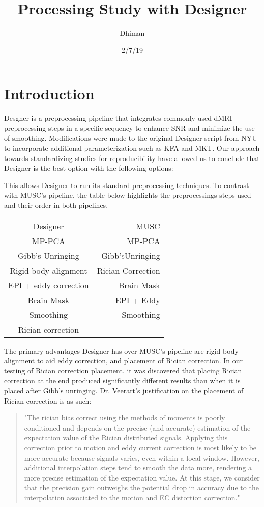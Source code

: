 \documentclass[12pt]{sop}
\title{Processing Study with Designer	}
\date{2/7/19}
\author{Dhiman}
\begin{document}
\maketitle
\section{Introduction}
Desgner is a preprocessing pipeline that integrates commonly used dMRI preprocessing steps in a specific sequency to enhance SNR and minimize the use of smoothing.
Modifications were made to the original Designer script from NYU to incorporate additional parameterization such as KFA and MKT.
Our approach towards standardizing studies for reproducibility have allowed us to conclude that Designer is the best option with the following options:

This allows Designer to run its standard preprocessing techniques. To contrast with MUSC's pipeline, the table below highlights the preprocessings steps used and their order in both pipelines.

\begin{tabular}{ | c | r |}
Designer             & MUSC              \\
MP-PCA               & MP-PCA            \\
Gibb's Unringing     & Gibb'sUnringing   \\
Rigid-body alignment & Rician Correction	\\
EPI + eddy correction & Brain Mask \\
Brain Mask & EPI + Eddy \\
Smoothing & Smoothing \\
Rician correction & 
\end{tabular}

The primary advantages Designer has over MUSC's pipeline are rigid body alignment to aid eddy correction, and placement of Rician correction. In our testing of Rician correction placement, it was discovered that placing Rician correction at the end produced significantly different results than when it is placed after Gibb's unringing. Dr. Veerart's justification on the placement of Rician correction is as such:

\begin{quote}
"The rician bias correct using the methods of moments is poorly conditioned and depends on the precise (and accurate) estimation of the expectation value of the Rician distributed signals.  Applying this correction prior to motion and eddy current correction is most likely to be more accurate because signals varies, even within a local window. However, additional interpolation steps tend to smooth the data more, rendering a more precise estimation of the expectation value. At this stage, we consider that the precision gain outweighs the potential drop in accuracy due to the interpolation associated to the motion and EC distortion correction."
\end{quote}
\end{document}
